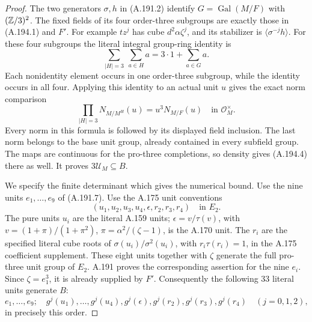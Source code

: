 \begin{proof}
The two generators \(\sigma,h\) in (A.191.2) identify
\(G=\operatorname{Gal}(M/F)\) with \((\mathbb Z/3)^2\).
The fixed fields of its four order-three subgroups are exactly
those in (A.194.1) and \(F'\).  For example \(tz^j\)
has cube \(d^2\alpha\zeta^j\), and its stabilizer is
\(\langle\sigma^{-j}h\rangle\).  For these four subgroups
the literal integral group-ring identity is
\[
       \sum_{|H|=3}\ \sum_{a\in H}a
                        =3\cdot1+\sum_{a\in G}a.
\tag{A.194.3}
\]
Each nonidentity element occurs in one order-three subgroup,
while the identity occurs in all four.  Applying this identity
to an actual unit \(u\) gives the exact norm comparison
\[
       \prod_{|H|=3}N_{M/M^H}(u)=u^3N_{M/F}(u)
                         \quad\text{in }\mathcal O_M^\times.
\tag{A.194.4}
\]
Every norm in this formula is followed by its displayed field
inclusion.  The last norm belongs to the base unit group, already
contained in every subfield group.  The maps are continuous for
the pro-three completions, so density gives (A.194.4) there as
well.  It proves \(3\mathcal U_M\subseteq B\).

We specify the finite determinant which gives the numerical
bound.  Use the nine units \(e_1,\ldots,e_9\) of (A.191.7).
Use the A.175 unit conventions
\[
 (u_1,u_2,u_3,u_4,\epsilon,r_2,r_3,r_4)
                                    \quad\text{in }E_2.
\tag{A.194.5}
\]
The pure units \(u_i\) are the literal A.159 units;
\(\epsilon=v/\tau(v)\), with
\(v=(1+\pi)/(1+\pi^2)\), \(\pi=\alpha^2/(\zeta-1)\),
is the A.170 unit.  The \(r_i\) are the specified literal
cube roots of \(\sigma(u_i)/\sigma^2(u_i)\), with
\(r_i\tau(r_i)=1\), in the A.175 coefficient supplement.
These eight units together with \(\zeta\) generate the
full pro-three unit group of \(E_2\).  A.191 proves the
corresponding assertion for the nine \(e_i\).
Since \(\zeta=e_1^3\), it is already supplied by \(F'\).
Consequently the following 33 literal units generate \(B\):
\[
 e_1,\ldots,e_9;\quad
  g^j(u_1),\ldots,g^j(u_4),g^j(\epsilon),
       g^j(r_2),g^j(r_3),g^j(r_4)\quad(j=0,1,2),
\tag{A.194.6}
\]
in precisely this order.


\end{proof}
